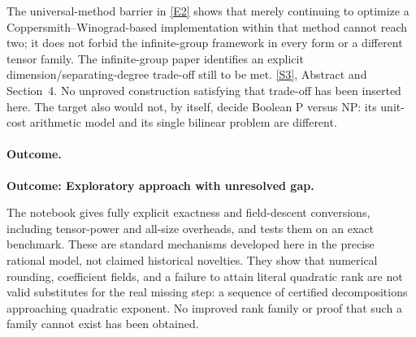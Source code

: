 \documentclass[11pt,a4paper]{article}
\newcommand{\sref}[2]{\hyperlink{source:#1:#2}{[S#2]}}
\newcommand{\eref}[2]{\hyperlink{extra:#1:#2}{[E#2]}}
\numberwithin{equation}{section}
\begin{document}
The universal-method barrier in \eref{26}{2} shows that merely continuing
to optimize a Coppersmith--Winograd-based implementation within that
method cannot reach two; it does not forbid the infinite-group framework
in every form or a different tensor family. The infinite-group paper
identifies an explicit dimension/separating-degree trade-off still to be
met. \sref{26}{3}, Abstract and Section~4. No unproved construction
satisfying that trade-off has been inserted here. The target also would
not, by itself, decide Boolean P versus NP: its unit-cost arithmetic
model and its single bilinear problem are different.

\paragraph{Outcome.}
\textbf{Outcome: Exploratory approach with unresolved gap.}

The notebook gives fully explicit exactness and field-descent conversions,
including tensor-power and all-size overheads, and tests them on an exact
benchmark. These are standard mechanisms developed here in the precise
rational model, not claimed historical novelties. They show that numerical
rounding, coefficient fields, and a failure to attain literal quadratic
rank are not valid substitutes for the real missing step: a sequence of
certified decompositions approaching quadratic exponent. No improved
rank family or proof that such a family cannot exist has been obtained.

\end{document}
